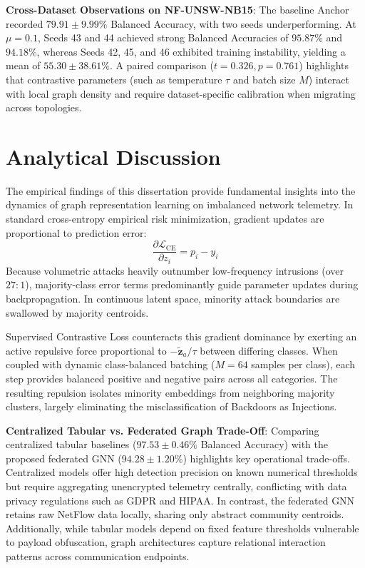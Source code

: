 \documentclass[12pt,a4paper]{report}
\begin{document}
\textbf{Cross-Dataset Observations on NF-UNSW-NB15}: The baseline Anchor recorded $79.91 \pm 9.99\%$ Balanced Accuracy, with two seeds underperforming. At $\mu = 0.1$, Seeds 43 and 44 achieved strong Balanced Accuracies of $95.87\%$ and $94.18\%$, whereas Seeds 42, 45, and 46 exhibited training instability, yielding a mean of $55.30 \pm 38.61\%$. A paired comparison ($t = 0.326, p = 0.761$) highlights that contrastive parameters (such as temperature $\tau$ and batch size $M$) interact with local graph density and require dataset-specific calibration when migrating across topologies.

\section{Analytical Discussion}\label{sec:discussion}

The empirical findings of this dissertation provide fundamental insights into the dynamics of graph representation learning on imbalanced network telemetry. In standard cross-entropy empirical risk minimization, gradient updates are proportional to prediction error:
\begin{equation}
\frac{\partial \mathcal{L}_{\text{CE}}}{\partial z_i} = p_i - y_i
\end{equation}
Because volumetric attacks heavily outnumber low-frequency intrusions (over $27:1$), majority-class error terms predominantly guide parameter updates during backpropagation. In continuous latent space, minority attack boundaries are swallowed by majority centroids.

Supervised Contrastive Loss counteracts this gradient dominance by exerting an active repulsive force proportional to $-\tilde{\boldsymbol{z}}_a / \tau$ between differing classes. When coupled with dynamic class-balanced batching ($M = 64$ samples per class), each step provides balanced positive and negative pairs across all categories. The resulting repulsion isolates minority embeddings from neighboring majority clusters, largely eliminating the misclassification of Backdoors as Injections.

\textbf{Centralized Tabular vs. Federated Graph Trade-Off}: Comparing centralized tabular baselines ($97.53 \pm 0.46\%$ Balanced Accuracy) with the proposed federated GNN ($94.28 \pm 1.20\%$) highlights key operational trade-offs. Centralized models offer high detection precision on known numerical thresholds but require aggregating unencrypted telemetry centrally, conflicting with data privacy regulations such as GDPR and HIPAA. In contrast, the federated GNN retains raw NetFlow data locally, sharing only abstract community centroids. Additionally, while tabular models depend on fixed feature thresholds vulnerable to payload obfuscation, graph architectures capture relational interaction patterns across communication endpoints.
\end{document}
